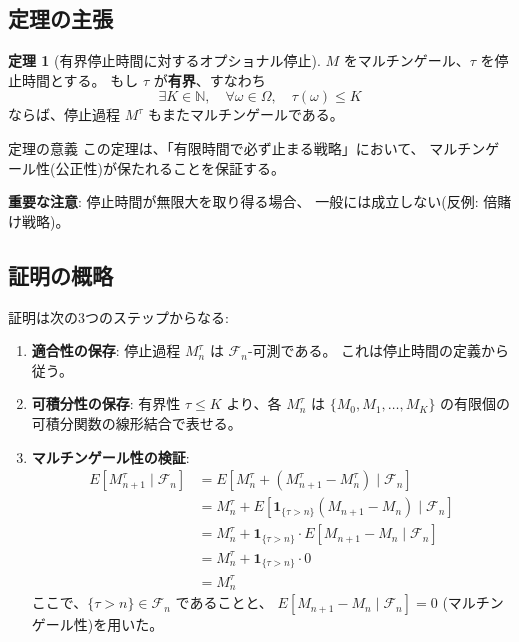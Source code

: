 \documentclass[a4paper,12pt]{ltjsarticle}
\theoremstyle{definition}
\newtheorem{theorem}[definition]{定理}
\begin{document}
\subsection{定理の主張}

\begin{theorem}[有界停止時間に対するオプショナル停止]\label{thm:optional_stopping}
$M$ をマルチンゲール、$\tau$ を停止時間とする。
もし $\tau$ が\textbf{有界}、すなわち
\[
\exists K \in \mathbb{N}, \quad \forall \omega \in \Omega, \quad \tau(\omega) \leq K
\]
ならば、停止過程 $M^\tau$ もまたマルチンゲールである。
\end{theorem}

\begin{mainbox}{定理の意義}
この定理は、「有限時間で必ず止まる戦略」において、
マルチンゲール性(公正性)が保たれることを保証する。

\textbf{重要な注意}: 停止時間が無限大を取り得る場合、
一般には成立しない(反例: 倍賭け戦略)。
\end{mainbox}

\subsection{証明の概略}

証明は次の3つのステップからなる:

\begin{enumerate}
\item \textbf{適合性の保存}:
停止過程 $M^\tau_n$ は $\mathcal{F}_n$-可測である。
これは停止時間の定義から従う。

\item \textbf{可積分性の保存}:
有界性 $\tau \leq K$ より、各 $M^\tau_n$ は
$\{M_0, M_1, \ldots, M_K\}$ の有限個の可積分関数の線形結合で表せる。

\item \textbf{マルチンゲール性の検証}:
\begin{align}
E[M^\tau_{n+1} \mid \mathcal{F}_n]
&= E[M^\tau_n + (M^\tau_{n+1} - M^\tau_n) \mid \mathcal{F}_n] \\
&= M^\tau_n + E[\mathbf{1}_{\{\tau > n\}} (M_{n+1} - M_n) \mid \mathcal{F}_n] \\
&= M^\tau_n + \mathbf{1}_{\{\tau > n\}} \cdot E[M_{n+1} - M_n \mid \mathcal{F}_n] \\
&= M^\tau_n + \mathbf{1}_{\{\tau > n\}} \cdot 0 \\
&= M^\tau_n
\end{align}
ここで、$\{\tau > n\} \in \mathcal{F}_n$ であることと、
$E[M_{n+1} - M_n \mid \mathcal{F}_n] = 0$ (マルチンゲール性)を用いた。
\end{enumerate}
\end{document}
